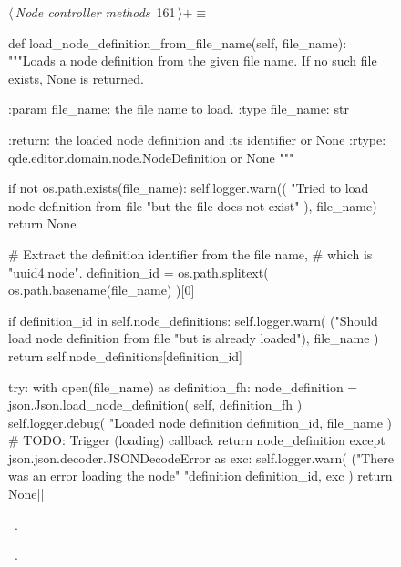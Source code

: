 \documentclass[%
    a4paper,    %
    justified,  %
    nobib,      %
    openany     %
]{tufte-book}
\makeatletter
\renewcommand{\label}[1]{\@tufte@label{##1}}%
\makeatother
\begin{document}
\begin{figure}[!htbp]
\begin{flushleft} \small
\begin{minipage}{\linewidth}\label{scrap123}\raggedright\small
{} $\langle\,${\itshape Node controller methods}\nobreak\ {\footnotesize {161}}$\,\rangle+\equiv$
\vspace{-1ex}
\begin{pythoncode}
def load_node_definition_from_file_name(self, file_name):
    """Loads a node definition from the given file name.
    If no such file exists, None is returned.

    :param file_name: the file name to load.
    :type  file_name: str

    :return: the loaded node definition and its identifier or
             None
    :rtype:  qde.editor.domain.node.NodeDefinition or None
    """

    if not os.path.exists(file_name):
        self.logger.warn((
            "Tried to load node definition from file %
            "but the file does not exist"
        ), file_name)
        return None

    # Extract the definition identifier from the file name,
    # which is "uuid4.node".
    definition_id = os.path.splitext(
        os.path.basename(file_name)
    )[0]

    if definition_id in self.node_definitions:
        self.logger.warn(
            ("Should load node definition from file %
            "but is already loaded"),
            file_name
        )
        return self.node_definitions[definition_id]

    try:
        with open(file_name) as definition_fh:
            node_definition = json.Json.load_node_definition(
                self, definition_fh
            )
            self.logger.debug(
                "Loaded node definition %
                definition_id, file_name
            )
            # TODO: Trigger (loading) callback
            return node_definition
    except json.json.decoder.JSONDecodeError as exc:
        self.logger.warn(
            ("There was an error loading the node"
             "definition %
            definition_id, exc
        )
        return None|\NWsep|
\end{pythoncode}
\vspace{1.5ex}
\footnotesize
\begin{list}{}{\setlength{\itemsep}{-\parsep}\setlength{\itemindent}{-\leftmargin}}
\item \NWtxtMacroDefBy\ .
\item \NWtxtMacroRefIn\ .


\end{list}
\end{minipage}
\end{flushleft}
\end{figure}
\end{document}
